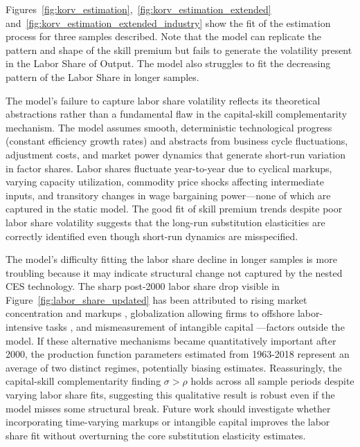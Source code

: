 \documentclass[12pt]{article}
\begin{document}
Figures~\ref{fig:korv_estimation},~\ref{fig:korv_estimation_extended} and~\ref{fig:korv_estimation_extended_industry} show the fit of the estimation process for three samples described. Note that the model can replicate the pattern and shape of the skill premium but fails to generate the volatility present in the Labor Share of Output. The model also struggles to fit the decreasing pattern of the Labor Share in longer samples.

The model's failure to capture labor share volatility reflects its theoretical abstractions rather than a fundamental flaw in the capital-skill complementarity mechanism. The model assumes smooth, deterministic technological progress (constant efficiency growth rates) and abstracts from business cycle fluctuations, adjustment costs, and market power dynamics that generate short-run variation in factor shares. Labor shares fluctuate year-to-year due to cyclical markups, varying capacity utilization, commodity price shocks affecting intermediate inputs, and transitory changes in wage bargaining power---none of which are captured in the static model. The good fit of skill premium trends despite poor labor share volatility suggests that the long-run substitution elasticities are correctly identified even though short-run dynamics are misspecified.

The model's difficulty fitting the labor share decline in longer samples is more troubling because it may indicate structural change not captured by the nested CES technology. The sharp post-2000 labor share drop visible in Figure~\ref{fig:labor_share_updated} has been attributed to rising market concentration and markups \citep{autor2020fall}, globalization allowing firms to offshore labor-intensive tasks \citep{elsby2013decline}, and mismeasurement of intangible capital \citep{koh2020labor}---factors outside the model. If these alternative mechanisms became quantitatively important after 2000, the production function parameters estimated from 1963-2018 represent an average of two distinct regimes, potentially biasing estimates. Reassuringly, the capital-skill complementarity finding $\sigma > \rho$ holds across all sample periods despite varying labor share fits, suggesting this qualitative result is robust even if the model misses some structural break. Future work should investigate whether incorporating time-varying markups or intangible capital improves the labor share fit without overturning the core substitution elasticity estimates.
\end{document}
